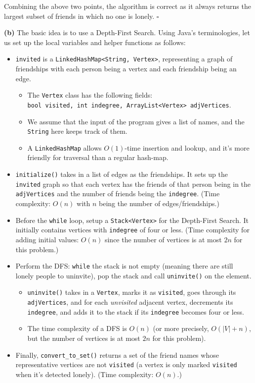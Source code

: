\documentclass{article}
\begin{document}
\begin{enumerate}
    Combining the above two points, the algorithm is correct as it always returns the largest subset of friends in which no one is lonely. $\square$

    \textbf{(b)} The basic idea is to use a Depth-First Search. Using Java's terminologies, let us set up the local variables and helper functions as follows:
    \begin{itemize}
      \item \texttt{invited} is a \texttt{LinkedHashMap<String, Vertex>}, representing a graph of friendships with each person being a vertex and each friendship being an edge.
        \begin{itemize}
          \item The \texttt{Vertex} class has the following fields:\\
            \texttt{bool visited, int indegree, ArrayList<Vertex> adjVertices}.
          \item We assume that the input of the program gives a list of names, and the \texttt{String} here keeps track of them.
          \item A \texttt{LinkedHashMap} allows $O(1)$-time insertion and lookup, and it's more friendly for traversal than a regular hash-map.
        \end{itemize}
      \item \texttt{initialize()} takes in a list of edges as the friendships. It sets up the \texttt{invited} graph so that each vertex has the friends of that person being in the \texttt{adjVertices} and the number of friends being the \texttt{indegree}. (Time complexity: $O(n)$ with $n$ being the number of edges/friendships.)
      \item Before the \texttt{while} loop, setup a \texttt{Stack<Vertex>} for the Depth-First Search. It initially contains vertices with \texttt{indegree} of four or less. (Time complexity for adding initial values: $O(n)$ since the number of vertices is at most $2n$ for this problem.)
      \item Perform the DFS: \texttt{while} the stack is not empty (meaning there are still lonely people to uninvite), pop the stack and call \texttt{uninvite()} on the element.
        \begin{itemize}
          \item \texttt{uninvite()} takes in a \texttt{Vertex}, marks it as \texttt{visited}, goes through its \texttt{adjVertices}, and for each \textit{unvisited} adjacent vertex, decrements its \texttt{indegree}, and adds it to the stack if its \texttt{indegree} becomes four or less.
          \item The time complexity of a DFS is $O(n)$ (or more precisely, $O(|V| + n)$, but the number of vertices is at most $2n$ for this problem).
        \end{itemize}
      \item Finally, \texttt{convert\_to\_set()} returns a set of the friend names whose representative vertices are not \texttt{visited} (a vertex is only marked \texttt{visited} when it's detected lonely). (Time complexity: $O(n)$.)
    \end{itemize}


\end{enumerate}
\end{document}
